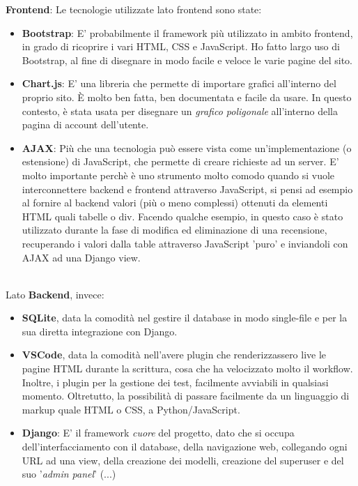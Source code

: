 \documentclass[12pt]{article}
\begin{document}
	\noindent \textbf{Frontend}: Le tecnologie utilizzate lato frontend sono state: 
	\begin{itemize}
		\item \textbf{Bootstrap}: E' probabilmente il framework più utilizzato in ambito frontend, in grado di ricoprire i vari HTML, CSS e JavaScript. Ho fatto largo uso di Bootstrap, al fine di disegnare in modo facile e veloce le varie pagine del sito. \\
		
		\item \textbf{Chart.js}: E' una libreria che permette di importare grafici all'interno del proprio sito. È molto ben fatta, ben documentata e facile da usare. In questo contesto, è stata usata per disegnare un \textit{grafico poligonale} all'interno della pagina di account dell'utente. \\
		
		\item \textbf{AJAX}: Più che una tecnologia può essere vista come un'implementazione (o estensione) di JavaScript, che permette di creare richieste ad un server. E' molto importante perchè è uno strumento molto comodo quando si vuole interconnettere backend e frontend attraverso JavaScript, si pensi ad esempio al fornire al backend valori (più o meno complessi) ottenuti da elementi HTML quali tabelle o div. Facendo qualche esempio, in questo caso è stato utilizzato durante la fase di modifica ed eliminazione di una recensione, recuperando i valori dalla table attraverso JavaScript 'puro' e inviandoli con AJAX ad una Django view. \\ \\
	\end{itemize}

	\noindent Lato \textbf{Backend}, invece: 
	\begin{itemize}
		\item \textbf{SQLite}, data la comodità nel gestire il database in modo single-file e per la sua diretta integrazione con Django. \\
		
		\item \textbf{VSCode}, data la comodità nell'avere plugin che renderizzassero live le pagine HTML durante la scrittura, cosa che ha velocizzato molto il workflow. Inoltre, i plugin per la gestione dei test, facilmente avviabili in qualsiasi momento. Oltretutto, la possibilità di passare facilmente da un linguaggio di markup quale HTML o CSS, a Python/JavaScript. \\
		

		
		\item \textbf{Django}: E' il framework \textit{cuore} del progetto, dato che si occupa dell'interfacciamento con il database, della navigazione web, collegando ogni URL ad una view, della creazione dei modelli, creazione del superuser e del suo '\textit{admin panel}' (...) \\ \\
	\end{itemize}
\end{document}
